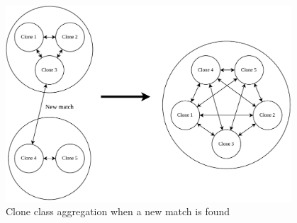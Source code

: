 \begin{figure}[t]
    \begin{center}
        \includegraphics[width=0.95\textwidth]{figures/cloneaggregation.drawio.pdf}
    \end{center}
    \caption{Clone class aggregation when a new match is found}
    \label{fig:cloneaggregation}
\end{figure}

